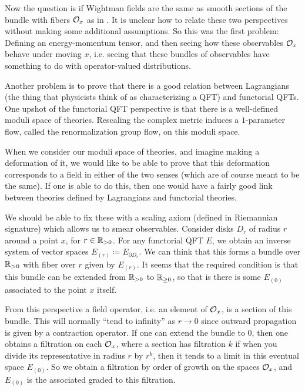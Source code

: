 Now the question is if Wightman fields are the same as smooth sections of the bundle with
fibers $\mathcal{O}_x$ as in .
It is unclear how to relate these two perspectives without making some additional
assumptions. 
So this was the first problem: Defining an energy-momentum tensor, and then seeing how
these observables $\mathcal{O}_x$ behave under moving $x$, i.e. seeing 
that these bundles of observables have something to do with operator-valued distributions. 

Another problem is to prove that there is a good relation between Lagrangians 
(the thing that physicists think of as characterizing a QFT)
and functorial QFTs.
One upshot of the functorial QFT perspective is that there is a well-defined moduli space
of theories. 
Rescaling the complex metric induces a $1$-parameter flow, called the 
renormalization group flow, on this moduli space.

When we consider our moduli space of theories, and imagine making a deformation of it, we
would like to be able to 
prove that this deformation corresponds to a field in either of
the two senses (which are of course meant to be the same).
If one is able to do this, then one would have a fairly good link between theories
defined by Lagrangians and functorial theories.

We should be able to fix these with a scaling axiom 
(defined in Riemannian signature) which allows us to smear observables. 
Consider disks $D_r$ of radius $r$ around a point $x$, for $r\in \mathbb{R}_{>0}$.
For any functorial QFT $E$, we obtain an inverse system of vector spaces
$E_{\left(r\right)} \coloneqq E_{\partial D_r}$. 
We can think that this forms a bundle over $\mathbb{R}_{>0}$ with fiber over $r$ given by
$E_{\left(r\right)}$.
It seems that the required condition is that this bundle can be extended from $\mathbb{R}_{>0}$
to $\mathbb{R}_{\geq 0}$, so that is there is some $E_{\left(0\right)}$ associated to the point
$x$ itself. 

From this perspective a field operator, 
i.e. an element of $\mathcal{O}_x$, is a section of this bundle.
This will normally ``tend to infinity'' as $r\to 0$
since outward propagation is given by a contraction operator.
If one can extend the bundle to $0$, then one obtains a filtration on each $\mathcal{O}_x$, where 
a section has filtration $k$ if 
when you divide its representative in radius $r$ by $r^k$, 
then it tends to a limit in this eventual space $E_{\left(0\right)}$.
So we obtain a filtration by order of growth on the spaces $\mathcal{O}_x$, and 
$E_{\left(0\right)}$ is the associated graded to this filtration. 

